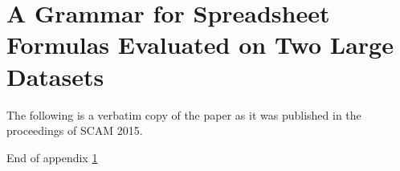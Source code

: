 \documentclass[11pt,a4paper,onecolumn,oneside,parskip]{memoir}
\newcommand{\emptypage}{%
\mbox{}%
\thispagestyle{empty}%
\newpage%
}
\begin{document}
%


\clearpage

\emptypage



\clearpage
{\small\tableofcontents*}

\clearpage





















\clearpage


\appendix



\chapter{A Grammar for Spreadsheet Formulas Evaluated on Two Large Datasets}
\label{appendix:xlparser}

The following is a verbatim copy of the paper as it was published in the proceedings of SCAM 2015.

\clearpage



\clearpage

\vspace*{\fill}

\centering
\large{End of appendix \ref{appendix:xlparser}}

\vspace*{\fill}
\end{document}
